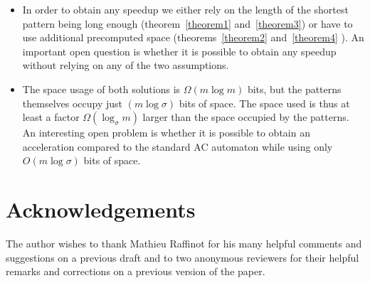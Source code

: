 \documentclass{article}
\newcommand{\?}{\mskip1.5mu}
\begin{document}
\begin{itemize}
\item In order to obtain any speedup we either rely on the length of the shortest pattern being long enough (theorem~\ref{theorem1} and~\ref{theorem3}) or have to use additional precomputed space (theorems~\ref{theorem2} and~\ref{theorem4} ). An important open question is whether it is possible to obtain any speedup without relying on any of the two assumptions.
\item The space usage of both solutions is $\Omega(m\log m)$ bits, but the patterns themselves occupy just $(m\log \sigma)$ bits of space. The space used is thus at least a factor $\Omega(\log_\sigma m)$ larger than the space occupied by the patterns. An interesting open problem is whether it is possible to obtain an acceleration compared to the standard AC automaton while using only $O(m\log\sigma)$ bits of space.
\end{itemize} 
\section*{Acknowledgements}
The author wishes to thank Mathieu Raffinot for his many helpful comments and suggestions on a previous draft and to two anonymous reviewers for their helpful remarks and corrections on a previous version of the paper. 
\small 
 
\normalsize
\end{document}
